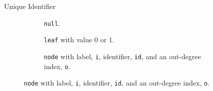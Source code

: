 \documentclass[english, aspectratio=169]{beamer}
\begin{document}
\begin{frame}{Unique Identifier}
  \begin{figure}
    \centering

    \begin{subfigure}{0.9\linewidth}
      \centering

      \begin{tikzpicture}
        
      \end{tikzpicture}

      \caption{\texttt{null}.}
    \end{subfigure}

    \begin{subfigure}{0.9\linewidth}
      \centering

      \begin{tikzpicture}
        
      \end{tikzpicture}

      \caption{\texttt{leaf} with value $0$ or $1$.}
    \end{subfigure}

    \begin{subfigure}{0.9\linewidth}
      \centering

      \begin{tikzpicture}
        
      \end{tikzpicture}

      \caption{\texttt{node} with label, \texttt{i}, identifier, \texttt{id}, and an
        out-degree index, \texttt{o}.}
    \end{subfigure}
  \end{figure}
\end{frame}
\end{document}
